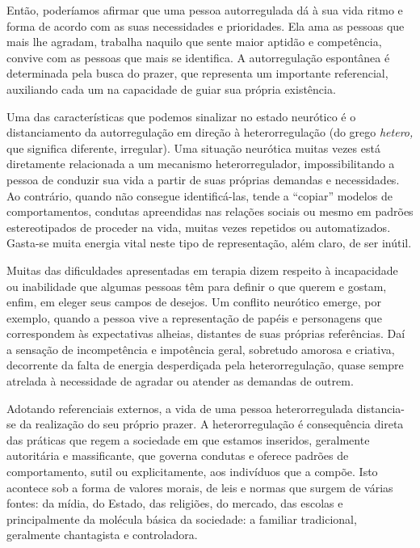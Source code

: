 Então, poderíamos afirmar que uma pessoa autorregulada dá à sua vida
ritmo e forma de acordo com as suas necessidades e prioridades. Ela ama
as pessoas que mais lhe agradam, trabalha naquilo que sente maior
aptidão e competência, convive com as pessoas que mais se identifica. A
autorregulação espontânea é determinada pela busca do prazer, que
representa um importante referencial, auxiliando cada um na capacidade
de guiar sua própria existência.

Uma das características que podemos sinalizar no estado neurótico é o
distanciamento da autorregulação em direção à heterorregulação (do grego
\emph{hetero,} que significa diferente, irregular). Uma situação
neurótica muitas vezes está diretamente relacionada a um mecanismo
heterorregulador, impossibilitando a pessoa de conduzir sua vida a
partir de suas próprias demandas e necessidades. Ao contrário, quando
não consegue identificá-las, tende a ``copiar'' modelos de
comportamentos, condutas apreendidas nas relações sociais ou mesmo em
padrões estereotipados de proceder na vida, muitas vezes repetidos ou
automatizados. Gasta-se muita energia vital neste tipo de representação,
além claro, de ser inútil.

Muitas das dificuldades apresentadas em terapia dizem respeito à
incapacidade ou inabilidade que algumas pessoas têm para definir o que
querem e gostam, enfim, em eleger seus campos de desejos. Um conflito
neurótico emerge, por exemplo, quando a pessoa vive a representação de
papéis e personagens que correspondem às expectativas alheias, distantes
de suas próprias referências. Daí a sensação de incompetência e
impotência geral, sobretudo amorosa e criativa, decorrente da falta de
energia desperdiçada pela heterorregulação, quase sempre atrelada à
necessidade de agradar ou atender as demandas de outrem.

Adotando referenciais externos, a vida de uma pessoa heterorregulada
distancia-se da realização do seu próprio prazer. A heterorregulação é
consequência direta das práticas que regem a sociedade em que estamos
inseridos, geralmente autoritária e massificante, que governa condutas e
oferece padrões de comportamento, sutil ou explicitamente, aos
indivíduos que a compõe. Isto acontece sob a forma de valores morais, de
leis e normas que surgem de várias fontes: da mídia, do Estado, das
religiões, do mercado, das escolas e principalmente da molécula básica
da sociedade: a familiar tradicional, geralmente chantagista e
controladora.

